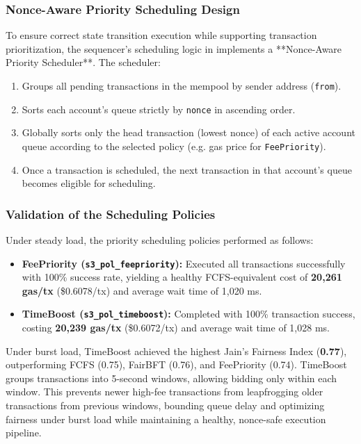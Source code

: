 \subsubsection{Nonce-Aware Priority Scheduling Design}
To ensure correct state transition execution while supporting transaction prioritization, the sequencer's scheduling logic in  implements a **Nonce-Aware Priority Scheduler**. The scheduler:
\begin{enumerate}
    \item Groups all pending transactions in the mempool by sender address (\texttt{from}).
    \item Sorts each account's queue strictly by \texttt{nonce} in ascending order.
    \item Globally sorts only the head transaction (lowest nonce) of each active account queue according to the selected policy (e.g. gas price for \texttt{FeePriority}).
    \item Once a transaction is scheduled, the next transaction in that account's queue becomes eligible for scheduling.
\end{enumerate}
\subsubsection{Validation of the Scheduling Policies}
Under steady load, the priority scheduling policies performed as follows:
\begin{itemize}
    \item \textbf{FeePriority (\texttt{s3\_pol\_feepriority}):} Executed all transactions successfully with 100\% success rate, yielding a healthy FCFS-equivalent cost of \textbf{20,261 gas/tx} (\$0.6078/tx) and average wait time of 1,020 ms.
    \item \textbf{TimeBoost (\texttt{s3\_pol\_timeboost}):} Completed with 100\% transaction success, costing \textbf{20,239 gas/tx} (\$0.6072/tx) and average wait time of 1,028 ms.
\end{itemize}
Under burst load, TimeBoost achieved the highest Jain's Fairness Index (\textbf{0.77}), outperforming FCFS (0.75), FairBFT (0.76), and FeePriority (0.74). TimeBoost groups transactions into 5-second windows, allowing bidding only within each window. This prevents newer high-fee transactions from leapfrogging older transactions from previous windows, bounding queue delay and optimizing fairness under burst load while maintaining a healthy, nonce-safe execution pipeline.
